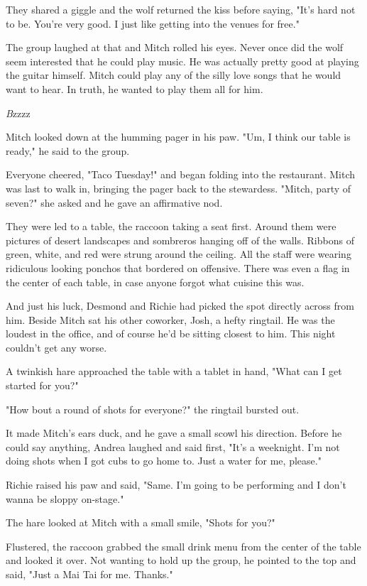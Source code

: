 They shared a giggle and the wolf returned the kiss before saying, "It's hard not to be. You're very good. I just like getting into the venues for free."

The group laughed at that and Mitch rolled his eyes. Never once did the wolf seem interested that he could play music. He was actually pretty good at playing the guitar himself. Mitch could play any of the silly love songs that he would want to hear. In truth, he wanted to play them all for him.

\emph{B}zzzz

Mitch looked down at the humming pager in his paw. "Um, I think our table is ready," he said to the group.

Everyone cheered, "Taco Tuesday!" and began folding into the restaurant. Mitch was last to walk in, bringing the pager back to the stewardess. "Mitch, party of seven?" she asked and he gave an affirmative nod.

They were led to a table, the raccoon taking a seat first. Around them were pictures of desert landscapes and sombreros hanging off of the walls. Ribbons of green, white, and red were strung around the ceiling. All the staff were wearing ridiculous looking ponchos that bordered on offensive. There was even a flag in the center of each table, in case anyone forgot what cuisine this was.

And just his luck, Desmond and Richie had picked the spot directly across from him. Beside Mitch sat his other coworker, Josh, a hefty ringtail. He was the loudest in the office, and of course he'd be sitting closest to him. This night couldn't get any worse.

A twinkish hare approached the table with a tablet in hand, "What can I get started for you?"

"How bout a round of shots for everyone?" the ringtail bursted out.

It made Mitch's ears duck, and he gave a small scowl his direction. Before he could say anything, Andrea laughed and said first, "It's a weeknight. I'm not doing shots when I got cubs to go home to. Just a water for me, please."

Richie raised his paw and said, "Same. I'm going to be performing and I don't wanna be sloppy on-stage."

The hare looked at Mitch with a small smile, "Shots for you?"

Flustered, the raccoon grabbed the small drink menu from the center of the table and looked it over. Not wanting to hold up the group, he pointed to the top and said, "Just a Mai Tai for me. Thanks."

